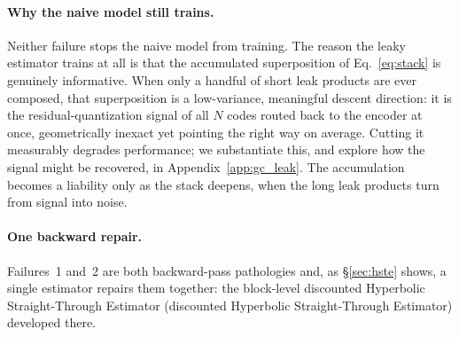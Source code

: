 \documentclass[12pt]{report}
\begin{document}
\paragraph{Why the naive model still trains.}
Neither failure stops the naive model from training. The reason the leaky estimator trains at all is that the accumulated superposition of Eq.~\ref{eq:stack} is genuinely informative. When only a handful of short leak products are ever composed, that superposition is a low-variance, meaningful descent direction: it is the residual-quantization signal of all $N$ codes routed back to the encoder at once, geometrically inexact yet pointing the right way on average. Cutting it measurably degrades performance; we substantiate this, and explore how the signal might be recovered, in Appendix~\ref{app:gc_leak}. The accumulation becomes a liability only as the stack deepens, when the long leak products turn from signal into noise.

\paragraph{One backward repair.} Failures~1 and~2 are both backward-pass pathologies and, as \S\ref{sec:hste} shows, a single estimator repairs them together: the block-level discounted Hyperbolic Straight-Through Estimator (discounted Hyperbolic Straight-Through Estimator) developed there.
\end{document}
